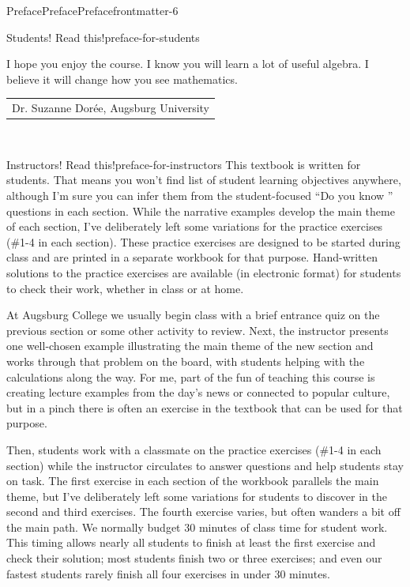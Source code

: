 \documentclass[twoside,11pt,]{book}
\numberwithin{equation}{section}
\begin{document}
\begin{preface}{Preface}{Preface}{}{Preface}{}{}{frontmatter-6}
\begin{paragraphs}{Students! Read this!}{preface-for-students}
\par
I hope you enjoy the course. I know you will learn a lot of useful algebra. I believe it will change how you see mathematics.%
\nopagebreak\par%
\hfill\begin{tabular}[t]{l@{}}
Dr. Suzanne Dorée, Augsburg University
\end{tabular}\\\par
\end{paragraphs}%
\begin{paragraphs}{Instructors! Read this!}{preface-for-instructors}%
This textbook is written for students. That means you won't find list of student learning objectives anywhere, although I'm sure you can infer them from the student-focused ``Do you know \textellipsis{}'' questions in each section. While the narrative examples develop the main theme of each section, I've deliberately left some variations for the practice exercises (\#1-4 in each section). These practice exercises are designed to be started during class and are printed in a separate workbook for that purpose. Hand-written solutions to the practice exercises are available (in electronic format) for students to check their work, whether in class or at home.%
\par
At Augsburg College we usually begin class with a brief entrance quiz on the previous section or some other activity to review. Next, the instructor presents one well-chosen example illustrating the main theme of the new section and works through that problem on the board, with students helping with the calculations along the way. For me, part of the fun of teaching this course is creating lecture examples from the day's news or connected to popular culture, but in a pinch there is often an exercise in the textbook that can be used for that purpose.%
\par
Then, students work with a classmate on the practice exercises (\#1-4 in each section) while the instructor circulates to answer questions and help students stay on task. The first exercise in each section of the workbook parallels the main theme, but I've deliberately left some variations for students to discover in the second and third exercises. The fourth exercise varies, but often wanders a bit off the main path. We normally budget 30 minutes of class time for student work. This timing allows nearly all students to finish at least the first exercise and check their solution; most students finish two or three exercises; and even our fastest students rarely finish all four exercises in under 30 minutes.%

\end{paragraphs}
\end{preface}
\end{document}
